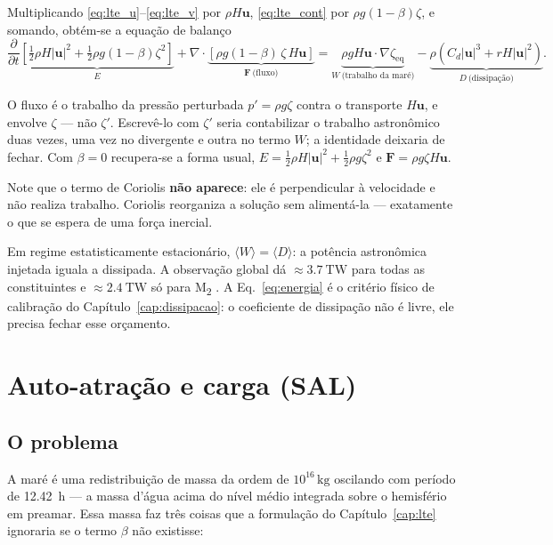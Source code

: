 \documentclass[11pt,a4paper,oneside]{report}
\theoremstyle{definition}
\theoremstyle{plain}
\theoremstyle{remark}
\newcommand{\vect}[1]{\bm{#1}}
\newcommand{\pd}[2]{\frac{\partial #1}{\partial #2}}
\begin{document}
Multiplicando \eqref{eq:lte_u}--\eqref{eq:lte_v} por $\rho H\vect{u}$,
\eqref{eq:lte_cont} por $\rho g(1-\beta)\zeta$, e somando, obtém-se a equação de
balanço
\begin{equation}
\pd{}{t}\underbrace{\left[\tfrac12\rho H|\vect{u}|^{2}
+\tfrac12\rho g(1-\beta)\zeta^{2}\right]}_{E}
+\nabla\cdot\underbrace{\left[\rho g(1-\beta)\,\zeta\,H\vect{u}\right]}_{\vect{F}\ \text{(fluxo)}}
=\underbrace{\rho g H\vect{u}\cdot\nabla\zeta_{\text{eq}}}_{W\ \text{(trabalho da maré)}}
-\underbrace{\rho\left(C_d|\vect{u}|^{3}+rH|\vect{u}|^{2}\right)}_{D\ \text{(dissipação)}} .
\label{eq:energia}
\end{equation}

O fluxo é o trabalho da pressão perturbada $p'=\rho g\zeta$ contra o transporte
$H\vect{u}$, e envolve $\zeta$ — não $\zeta'$. Escrevê-lo com $\zeta'$ seria
contabilizar o trabalho astronômico duas vezes, uma vez no divergente e outra no
termo $W$; a identidade deixaria de fechar. Com $\beta=0$ recupera-se a forma
usual, $E=\tfrac12\rho H|\vect{u}|^{2}+\tfrac12\rho g\zeta^{2}$ e
$\vect{F}=\rho g\zeta H\vect{u}$.

Note que o termo de Coriolis \textbf{não aparece}: ele é perpendicular à
velocidade e não realiza trabalho. Coriolis reorganiza a solução sem alimentá-la
— exatamente o que se espera de uma força inercial.

Em regime estatisticamente estacionário, $\langle W\rangle=\langle D\rangle$: a
potência astronômica injetada iguala a dissipada. A observação global dá
$\approx\SI{3.7}{\tera\watt}$ para todas as constituintes e
$\approx\SI{2.4}{\tera\watt}$ só para M\textsubscript{2}
\cite{egbert2000,munk1998}. A Eq.~\eqref{eq:energia} é o critério físico de
calibração do Capítulo~\ref{cap:dissipacao}: o coeficiente de dissipação não é
livre, ele precisa fechar esse orçamento.

\chapter{Auto-atração e carga (SAL)}
\label{cap:sal}

\section{O problema}

A maré é uma redistribuição de massa da ordem de $10^{16}\,\si{\kilo\gram}$
oscilando com período de \SI{12.42}{\hour} — a massa d'água acima do nível médio
integrada sobre o hemisfério em preamar. Essa massa faz três coisas que a
formulação do Capítulo~\ref{cap:lte} ignoraria se o termo $\beta$ não
existisse:
\end{document}
